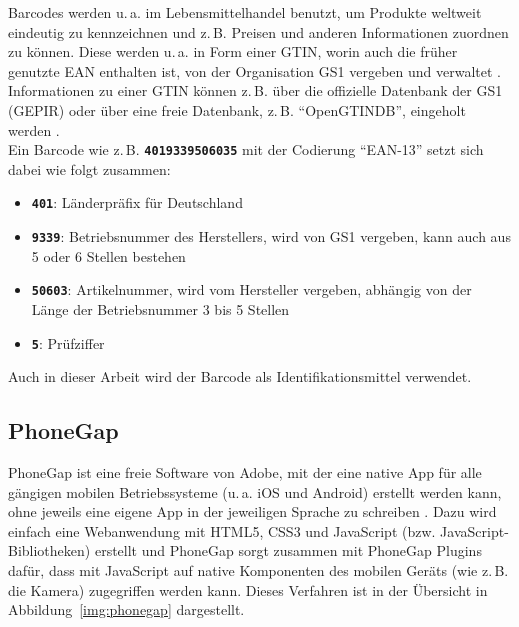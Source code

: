 Barcodes werden u.\,a. im Lebensmittelhandel benutzt, um Produkte
weltweit eindeutig zu kennzeichnen und z.\,B. Preisen und anderen
Informationen zuordnen zu können.
Diese werden u.\,a. in Form einer \ac{GTIN}, worin auch die früher
genutzte \ac{EAN} enthalten ist,
von der Organisation \ac{GS1}
vergeben und verwaltet .
Informationen zu einer \ac{GTIN} können z.\,B. über die 
offizielle Datenbank der \ac{GS1} (GEPIR) oder über eine freie
Datenbank, z.\,B. "`OpenGTINDB"', eingeholt werden .\\
Ein Barcode wie z.\,B. \texttt{\textbf{4019339506035}} mit der
Codierung "`EAN-13"' setzt sich dabei wie folgt
zusammen:

\begin{itemize}
	\item \texttt{\textbf{401}}: Länderpräfix für Deutschland 
	\item \texttt{\textbf{9339}}: Betriebsnummer des Herstellers, wird von
			\ac{GS1} vergeben, kann auch aus 5 oder
6 Stellen bestehen
	\item \texttt{\textbf{50603}}: Artikelnummer, wird vom Hersteller vergeben,
			abhängig von der Länge der Betriebsnummer 3 bis 5 Stellen
	\item \texttt{\textbf{5}}: Prüfziffer
\end{itemize}

Auch in dieser Arbeit wird der Barcode als Identifikationsmittel
verwendet.

\subsection{PhoneGap}
\label{sec:phonegap}

PhoneGap ist eine freie Software von Adobe, mit der eine native \ac{App}
für alle gängigen mobilen Betriebssysteme (u.\,a. iOS und Android)
erstellt werden kann, ohne jeweils eine eigene App in der jeweiligen
Sprache zu schreiben .
Dazu wird einfach eine Webanwendung mit HTML5, CSS3 und JavaScript
(bzw. JavaScript-Bibliotheken)
erstellt und PhoneGap sorgt zusammen mit PhoneGap Plugins dafür, dass mit
JavaScript auf native Komponenten des mobilen Geräts (wie z.\,B. die
Kamera) zugegriffen werden kann.
Dieses Verfahren ist in der Übersicht
in Abbildung~\ref{img:phonegap} dargestellt.

